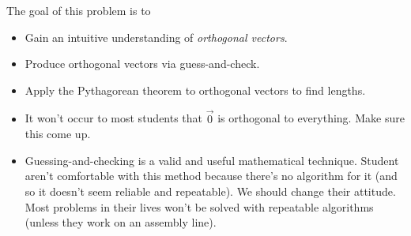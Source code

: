	\bookonlynewpage

	\question
	\begin{annotation}
		\begin{goals}

			The goal of this problem is to
			\begin{itemize}
				\item Gain an intuitive understanding of \emph{orthogonal vectors}.
				\item Produce orthogonal vectors via guess-and-check.
				\item Apply the Pythagorean theorem to orthogonal vectors to find lengths.
			\end{itemize}
		\end{goals}

		\begin{notes}
			\begin{itemize}
				\item It won't occur to most students that $\vec 0$ is orthogonal to everything. Make sure
					this come up.
				\item Guessing-and-checking is a valid and useful mathematical technique. Student aren't
					comfortable with this method because there's no algorithm for it (and so it
					doesn't seem reliable and repeatable). We should change their attitude. Most problems
					in their lives won't be solved with repeatable algorithms (unless they work on
					an assembly line).
			\end{itemize}
		\end{notes}
	\end{annotation}
